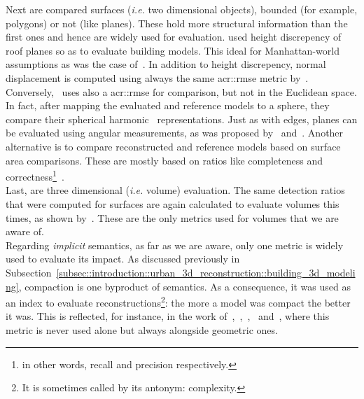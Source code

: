             Next are compared surfaces (\textit{i.e.} two dimensional objects), bounded (for example, polygons) or not (like planes).
            These hold more structural information than the first ones and hence are widely used for evaluation.
            \textcite{rottensteiner2014results} used height discrepency of roof planes so as to evaluate building models.
            This ideal for Manhattan-world assumptions as was the case of~\textcite{zebedin2008fusion}.
            In addition to height discrepency, normal displacement is computed using always the same \gls{acr::rmse} metric by~\textcite{henricsson19973}.
            Conversely,~\textcite{zeng2014multicriteria} uses also a \gls{acr::rmse} for comparison, but not in the Euclidean space.
            In fact, after mapping the evaluated and reference models to a sphere, they compare their spherical harmonic~\parencite{brechbuhler1995parametrization} representations.
            Just as with edges, planes can be evaluated using angular measurements, as was proposed by~\textcite{landes2012quality} and~\textcite{henricsson19973}.
            Another alternative is to compare reconstructed and reference models based on surface area comparisons.
            These are mostly based on ratios like completeness and correctness\footnote{in other words, recall and precision respectively.}~\parencite{rottensteiner2014results,landes2012quality,henricsson19973,schuster2003new}.\\

            Last, are three dimensional (\textit{i.e.} volume) evaluation.
            The same detection ratios that were computed for surfaces are again calculated to evaluate volumes this times, as shown by~\textcite{mohamed2013quality, zeng2014multicriteria,jaynes2003recognition,nguatem2017modeling}.
            These are the only metrics used for volumes that we are aware of.\\

            Regarding \textit{implicit} semantics, as far as we are aware, only one metric is widely used to evaluate its impact.
            As discussed previously in Subsection~\ref{subsec::introduction::urban_3d_reconstruction::building_3d_modeling}, compaction is one byproduct of semantics.
            As a consequence, it was used as an index to evaluate reconstructions\footnote{It is sometimes called by its antonym: complexity.}: the more a model was compact the better it was.
            This is reflected, for instance, in the work of~\textcite{lafarge2012creating},~\textcite{zhang2017deep},~\textcite{duan_eccv16},~\textcite{zeng2018neural} and~\textcite{zhu2018large}, where this metric is never used alone but always alongside geometric ones.

